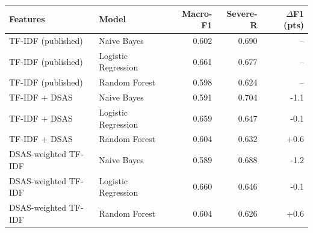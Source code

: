 \begin{tabular}{llrrr}
\toprule
Features & Model & Macro-F1 & Severe-R & $\Delta$F1 (pts) \\
\midrule
TF-IDF (published) & Naive Bayes & 0.602 & 0.690 & -- \\
TF-IDF (published) & Logistic Regression & 0.661 & 0.677 & -- \\
TF-IDF (published) & Random Forest & 0.598 & 0.624 & -- \\
TF-IDF + DSAS & Naive Bayes & 0.591 & 0.704 & -1.1 \\
TF-IDF + DSAS & Logistic Regression & 0.659 & 0.647 & -0.1 \\
TF-IDF + DSAS & Random Forest & 0.604 & 0.632 & +0.6 \\
DSAS-weighted TF-IDF & Naive Bayes & 0.589 & 0.688 & -1.2 \\
DSAS-weighted TF-IDF & Logistic Regression & 0.660 & 0.646 & -0.1 \\
DSAS-weighted TF-IDF & Random Forest & 0.604 & 0.626 & +0.6 \\
\bottomrule
\end{tabular}%
